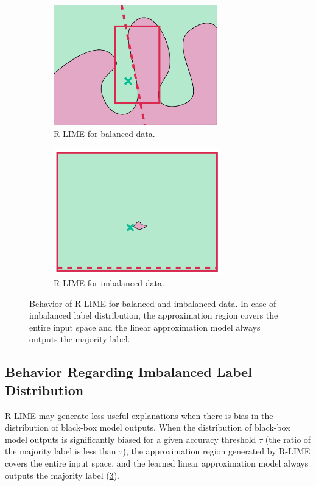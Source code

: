 \documentclass[runningheads]{llncs}
\begin{document}
 {%
  \def\imgwidth{0.49\textwidth}
  \begin{figure}[t]
    \centering
    \begin{subfigure}[t]{\imgwidth}
      \centering
      \includegraphics[width=0.78\textwidth]{newlime}
      \caption{R-LIME for balanced data.}\label{fig:balanced}
    \end{subfigure}
    \begin{subfigure}[t]{\imgwidth}
      \centering
      \includegraphics[width=0.8\textwidth]{newlime_for_imbalanced_data}
      \caption{R-LIME for imbalanced data.
      }\label{fig:imbalanced}
    \end{subfigure}
    \caption{%
      Behavior of R-LIME for balanced and imbalanced data.
      In case of imbalanced label distribution, 
      the approximation region covers the entire input space and the
      linear approximation model always outputs the majority label.
    }
    \vspace{10pt}
  \end{figure}
 }

\subsection{Behavior Regarding Imbalanced Label Distribution}
R-LIME may generate less useful explanations when there is bias in the distribution of black-box model outputs. When the distribution of black-box model outputs is significantly biased for a given accuracy threshold $\tau$ (the ratio of the majority label is less than $\tau$), the approximation region generated by R-LIME covers the entire input space, and the learned linear approximation model always outputs the majority label (\cref{fig:imbalanced}).
\end{document}
